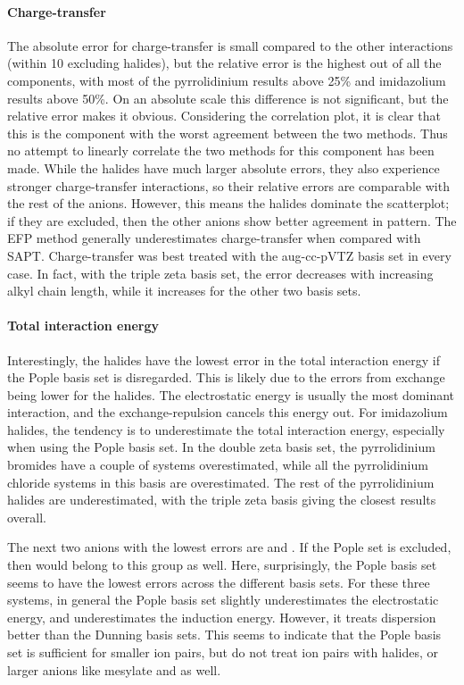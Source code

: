 \paragraph{Charge-transfer}
The absolute error for charge-transfer is small compared to the other interactions (within 10 \enUnit excluding halides), but the relative error is the highest out of all the components, with most of the pyrrolidinium results above 25\% and imidazolium results above 50\%.
On an absolute scale this difference is not significant, but the relative error makes it obvious.
Considering the correlation plot, it is clear that this is the component with the worst agreement between the two methods.
Thus no attempt to linearly correlate the two methods for this component has been made.
While the halides have much larger absolute errors, they also experience stronger charge-transfer interactions, so their relative errors are comparable with the rest of the anions.
However, this means the halides dominate the scatterplot; if they are excluded, then the other anions show better agreement in pattern.
The EFP method generally underestimates charge-transfer when compared with SAPT.
Charge-transfer was best treated with the aug-cc-pVTZ basis set in every case.
In fact, with the triple zeta basis set, the error decreases with increasing alkyl chain length, while it increases for the other two basis sets.


\paragraph{Total interaction energy}
Interestingly, the halides have the lowest error in the total interaction energy if the Pople basis set is disregarded.
This is likely due to the errors from exchange being lower for the halides.
The electrostatic energy is usually the most dominant interaction, and the exchange-repulsion cancels this energy out.
For imidazolium halides, the tendency is to underestimate the total interaction energy, especially when using the Pople basis set.
In the double zeta basis set, the pyrrolidinium bromides have a couple of systems overestimated, while all the pyrrolidinium chloride systems in this basis are overestimated.
The rest of the pyrrolidinium halides are underestimated, with the triple zeta basis giving the closest results overall.


The next two anions with the lowest errors are \dca and \bfl. 
If the Pople set is excluded, then \pf would belong to this group as well.
Here, surprisingly, the Pople basis set seems to have the lowest errors across the different basis sets.
For these three systems, in general the Pople basis set slightly underestimates the electrostatic energy, and underestimates the induction energy.
However, it treats dispersion better than the Dunning basis sets.
This seems to indicate that the Pople basis set is sufficient for smaller ion pairs, but do not treat ion pairs with halides, or larger anions like mesylate and \ntf as well.


